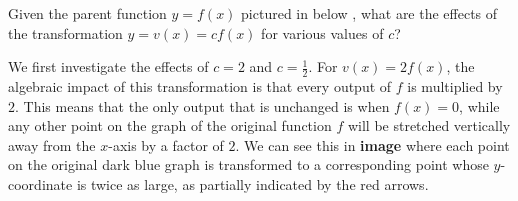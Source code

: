\documentclass[handout, noauthor, nooutcomes]{ximera}
\begin{document}
\begin{example}
Given the parent function \(y = f(x)\) pictured in below , what are the effects of the transformation \(y = v(x) = cf(x)\) for various values of \(c\)?%

\begin{explanation}
We first investigate the effects of \(c = 2\) and \(c = \frac{1}{2}\).  For \(v(x) = 2f(x)\), the algebraic impact of this transformation is that every output of \(f\) is multiplied by \(2\).  This means that the only output that is unchanged is when \(f(x) = 0\), while any other point on the graph of the original function \(f\) will be stretched vertically away from the \(x\)-axis by a factor of \(2\).  We can see this in \textbf{image} where each point on the original dark blue graph is transformed to a corresponding point whose \(y\)-coordinate is twice as large, as partially indicated by the red arrows.%


\end{explanation}
\end{example}
\end{document}
